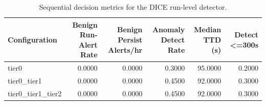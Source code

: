 \begin{table}[t]
\centering
\caption{Sequential decision metrics for the DICE run-level detector.}
\label{tab:dice_sequential_metrics}
\footnotesize
\begin{tabular}{lrrrrr}
\toprule
Configuration & Benign Run-Alert Rate & Benign Persist Alerts/hr & Anomaly Detect Rate & Median TTD (s) & Detect <=300s \\
\midrule
tier0 & 0.0000 & 0.0000 & 0.3000 & 95.0000 & 0.2000 \\
tier0_tier1 & 0.0000 & 0.0000 & 0.4500 & 92.0000 & 0.3000 \\
tier0_tier1_tier2 & 0.0000 & 0.0000 & 0.4500 & 92.0000 & 0.3000 \\
\bottomrule
\end{tabular}

\end{table}
